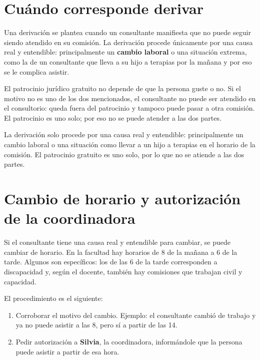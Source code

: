 \documentclass[12pt,oneside]{book}
\begin{document}
\section{Cuándo corresponde derivar}

Una derivación se plantea cuando un consultante manifiesta que no puede seguir siendo atendido en su comisión. La derivación procede únicamente por una causa real y entendible: principalmente un \textbf{cambio laboral} o una situación extrema, como la de un consultante que lleva a su hijo a terapias por la mañana y por eso se le complica asistir.

El patrocinio jurídico gratuito no depende de que la persona guste o no. Si el motivo no es uno de los dos mencionados, el consultante no puede ser atendido en el consultorio: queda fuera del patrocinio y tampoco puede pasar a otra comisión. El patrocinio es uno solo; por eso no se puede atender a las dos partes.


\begin{important}
La derivación solo procede por una causa real y entendible: principalmente un cambio laboral o una situación como llevar a un hijo a terapias en el horario de la comisión. El patrocinio gratuito es uno solo, por lo que no se atiende a las dos partes.
\end{important}

\section{Cambio de horario y autorización de la coordinadora}

Si el consultante tiene una causa real y entendible para cambiar, se puede cambiar de horario. En la facultad hay horarios de 8 de la mañana a 6 de la tarde. Algunos son específicos: los de las 6 de la tarde corresponden a discapacidad y, según el docente, también hay comisiones que trabajan civil y capacidad.


El procedimiento es el siguiente:

\begin{enumerate}
    \item Corroborar el motivo del cambio. Ejemplo: el consultante cambió de trabajo y ya no puede asistir a las 8, pero sí a partir de las 14.
    \item Pedir autorización a \textbf{Silvia}, la coordinadora, informándole que la persona puede asistir a partir de esa hora.
\end{enumerate}
\end{document}
